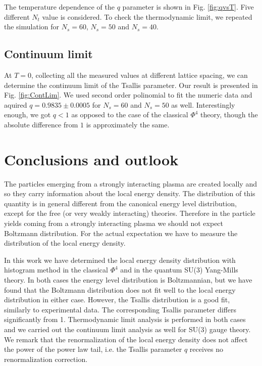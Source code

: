 \documentclass[aps,prd,twocolumn,showpacs,superscriptaddress,groupedaddress]{revtex4}  %
\begin{document}
The temperature dependence of the $q$ parameter is shown in Fig.
\ref{fig:qvsT}. Five different $N_t$ value is considered. To check the
thermodynamic limit, we repeated the simulation for \mbox{$N_s=60$},
\mbox{$N_s=50$} and \mbox{$N_s=40$}.  

\subsection{Continuum limit}

At $T=0$, collecting all the measured values at different lattice
spacing, we can determine the continuum limit of the Tsallis
parameter. Our result is presented in Fig. \ref{fig:ContLim}. We
used second order polinomial to fit the numeric data and aquired
$q=0.9835\pm0.0005$ for \mbox{$N_s=60$} and \mbox{$N_s=50$} as
well. Interestingly enough, we got \mbox{$q<1$} as opposed to the case
of the classical $\Phi^4$ theory, though the absolute difference from
$1$ is approximately the same.  

\section{Conclusions and outlook}

The particles emerging from a strongly interacting plasma are created
locally and so they carry information about the local energy
density. The distribution of this quantity is in general different
from the canonical energy level distribution, except for the free (or
very weakly interacting) theories. Therefore in the particle yields
coming from a strongly interacting plasma we should not expect
Boltzmann distribution. For the actual expectation we have to
measure the distribution of the local energy density.

In this work we have determined the local energy density distribution
with histogram method in the classical $\Phi^4$ and in the quantum
SU(3) Yang-Mills theory. In both cases the energy level distribution
is Boltzmannian, but we have found that the Boltzmann distribution
does not fit well to the local energy distribution in either
case. However, the Tsallis distribution is a good fit, similarly to
experimental data. The corresponding Tsallis parameter differs
significantly from 1. Thermodynamic limit analysis is performed in
both cases and we carried out the continuum limit analysis as well for
SU(3) gauge theory. We remark that the renormalization of the local
energy density does not affect the power of the power law tail,
i.e. the Tsallis parameter $q$ receives no renormalization correction.
\end{document}
